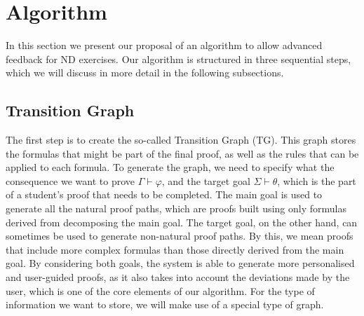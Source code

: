 \section{Algorithm}
In this section we present our proposal of an algorithm to allow advanced feedback for ND exercises.
Our algorithm is structured in three sequential steps, which we will discuss in more detail in the following subsections.


\subsection{Transition Graph}
The first step is to create the so-called Transition Graph (TG). This graph stores the formulas that might be part of the final proof, as well as the rules that can be applied to each formula. 
To generate the graph, we need to specify what the consequence we want to prove \(\Gamma \vdash \varphi\), and the target goal \(\Sigma \vdash \theta\), which is the part of a student's proof that needs to be completed. The main goal is used to generate all the natural proof paths, which are proofs built using only formulas derived from decomposing the main goal. The target goal, on the other hand, can sometimes be used to generate non-natural proof paths. By this, we mean proofs that include more complex formulas than those directly derived from the main goal. By considering both goals, the system is able to generate more personalised and user-guided proofs, as it also takes into account the deviations made by the user, which is one of the core elements of our algorithm. For the type of information we want to store, we will make use of a special type of graph.

